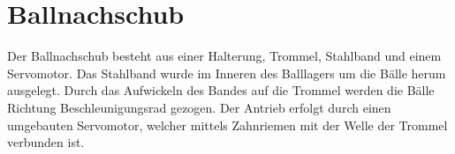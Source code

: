 \section{Ballnachschub}
Der Ballnachschub besteht aus einer Halterung, Trommel, Stahlband und einem Servomotor. Das Stahlband wurde im Inneren des Balllagers um die Bälle herum ausgelegt. Durch das Aufwickeln des Bandes auf die Trommel werden die Bälle Richtung Beschleunigungsrad gezogen. Der Antrieb erfolgt durch einen umgebauten Servomotor, welcher mittels Zahnriemen mit der Welle der Trommel verbunden ist.